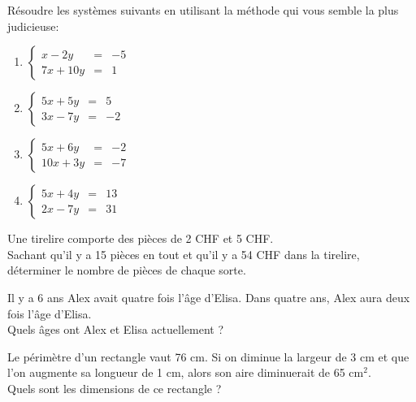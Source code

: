 \begin{exercice}
Résoudre les systèmes suivants en utilisant la méthode qui vous semble la plus judicieuse:

\begin{enumerate}
 \item $\left\lbrace\begin{array}{lll}
x-2y&=& -5\\
7x+10y&=& 1
\end{array}\right.$

\item $\left\lbrace\begin{array}{lll}
 5x+5y&=&5 \\
 3x-7y&=&-2
\end{array}\right.$

\item $\left\lbrace\begin{array}{lll}
 5x+6y&=&-2 \\
 10x+3y&=&-7
\end{array}\right.$

\item $\left\lbrace\begin{array}{lll}
 5x+4y&=&13 \\
 2x-7y&=&31
\end{array}\right.$

\end{enumerate}
\end{exercice}

\begin{exercice}
Une tirelire comporte des pièces de 2 CHF et 5 CHF.\\
Sachant qu’il y a 15 pièces en tout et qu'il y a 54 CHF dans la tirelire, déterminer le nombre de pièces de chaque sorte.
\end{exercice}

\begin{exercice}
Il y a 6 ans Alex avait quatre fois l’âge d’Elisa. Dans quatre ans, Alex aura deux fois 	l’âge d’Elisa.\\
 Quels âges ont Alex et Elisa actuellement ?
\end{exercice}

\begin{exercice}
Le périmètre d’un rectangle vaut 76 cm. Si on diminue la largeur de 3 cm et que l’on augmente sa longueur de 1 cm, alors son aire diminuerait de 65 cm$^2$.\\
Quels sont les dimensions de ce rectangle ?
\end{exercice}


